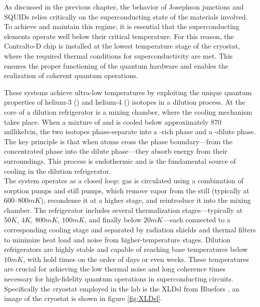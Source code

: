 As discussed in the previous chapter, the behavior of Josephson junctions and SQUIDs relies critically on the superconducting state of the materials involved. 
To achieve and maintain this regime, it is essential that the superconducting elements operate well below their critical temperature. 
For this reason, the Contralto-D chip is installed at the lowest temperature stage of the cryostat, where the required thermal conditions for superconductivity are met. 
This ensures the proper functioning of the quantum hardware and enables the realization of coherent quantum operations.

These systems achieve ultra-low temperatures by exploiting the unique quantum properties of helium-3 () and helium-4 () isotopes in a dilution process.
At the core of a dilution refrigerator is a mixing chamber, where the cooling mechanism takes place. 
When a mixture of  and  is cooled below approximately 870 millikelvin, the two isotopes phase-separate into a -rich phase and a -dilute phase. 
The key principle is that when  atoms cross the phase boundary—from the concentrated phase into the dilute phase—they absorb energy from their surroundings. 
This process is endothermic and is the fundamental source of cooling in the dilution refrigerator.\\
The system operates as a closed loop:  gas is circulated using a combination of sorption pumps and still pumps, which remove  vapor from the still (typically at $600–800 mK$), recondense it at a higher stage, and reintroduce it into the mixing chamber. 
The refrigerator includes several thermalization stages—typically at $50 K$, $4 K$, $800 mK$, $100 mK$, and finally below $20 mK$—each connected to a corresponding cooling stage and separated by radiation shields and thermal filters to minimize heat load and noise from higher-temperature stages.
Dilution refrigerators are highly stable and capable of reaching base temperatures below $10 mK$, with hold times on the order of days or even weeks. 
These temperatures are crucial for achieving the low thermal noise and long coherence times necessary for high-fidelity quantum operations in superconducting circuits.
Specifically the cryostat employed in the lab is the XLDsl from Bluefors \cite{XLD1000}, an image of the cryostat is shown in figure \ref{fig:XLDsl}.

